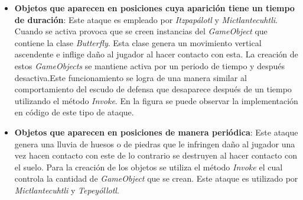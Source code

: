 \begin{itemize}
        \item \textbf{Objetos que aparecen en posiciones cuya aparición tiene un tiempo
        de duración}: Este ataque es empleado por \textit{Itzpapálotl} y
        \textit{Mictlantecuhtli}. Cuando se activa provoca que se creen instancias del
        \textit{GameObject} que contiene la clase \textit{Butterfly}. Esta clase genera
        un movimiento vertical ascendente e inflige daño al jugador al hacer contacto
        con esta. La creación de estos \textit{GameObjects} se mantiene activa por un
        periodo de tiempo y después desactiva.Este funcionamiento se logra de una
        manera similar al comportamiento del escudo de defensa que desaparece después
        de un tiempo utilizando el método \textit{Invoke}. En la figura se puede
        observar la implementación en código de este tipo de ataque.  

        \item \textbf{Objetos que aparecen en posiciones de manera periódica}: Este
        ataque genera una lluvia de huesos o de piedras que le infringen daño al
        jugador una vez hacen contacto con este de lo contrario se destruyen al hacer
        contacto con el suelo. Para la creación de los objetos se utiliza el método
        \textit{Invoke} el cual controla la cantidad de \textit{GameObject} que se
        crean. Este ataque es utilizado por \textit{Mictlantecuhtli} y
        \textit{Tepeyóllotl}.
    \end{itemize}
 
